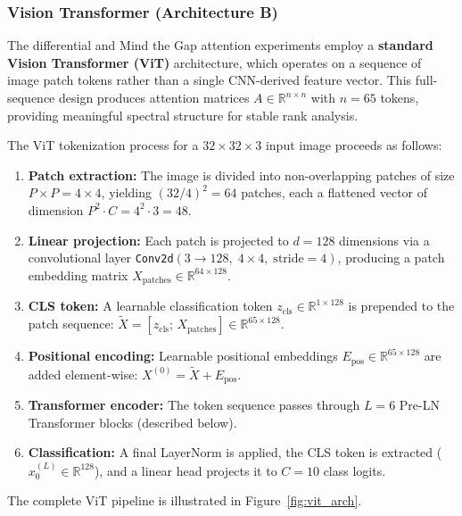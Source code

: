\documentclass[12pt, a4paper]{article}
\begin{document}
\subsubsection{Vision Transformer (Architecture B)}

The differential and Mind the Gap attention experiments employ a
\textbf{standard Vision Transformer (ViT)} architecture, which operates
on a sequence of image patch tokens rather than a single CNN-derived
feature vector. This full-sequence design produces attention matrices
$A \in \mathbb{R}^{n \times n}$ with $n = 65$ tokens, providing
meaningful spectral structure for stable rank analysis.

The ViT tokenization process for a $32 \times 32 \times 3$ input image
proceeds as follows:
\begin{enumerate}[label=(\roman*)]
    \item \textbf{Patch extraction:} The image is divided into
          non-overlapping patches of size $P \times P = 4 \times 4$,
          yielding $(32 / 4)^2 = 64$ patches, each a flattened vector
          of dimension $P^2 \cdot C = 4^2 \cdot 3 = 48$.
    \item \textbf{Linear projection:} Each patch is projected to
          $d = 128$ dimensions via a convolutional layer
          \texttt{Conv2d}$(3 \to 128, \; 4 \times 4, \;
          \text{stride} = 4)$, producing a patch embedding matrix
          $X_{\text{patches}} \in \mathbb{R}^{64 \times 128}$.
    \item \textbf{CLS token:} A learnable classification token
          $z_{\text{cls}} \in \mathbb{R}^{1 \times 128}$ is prepended
          to the patch sequence:
          $\tilde{X} = [z_{\text{cls}};\, X_{\text{patches}}]
          \in \mathbb{R}^{65 \times 128}$.
    \item \textbf{Positional encoding:} Learnable positional embeddings
          $E_{\text{pos}} \in \mathbb{R}^{65 \times 128}$ are added
          element-wise:
          $X^{(0)} = \tilde{X} + E_{\text{pos}}$.
    \item \textbf{Transformer encoder:} The token sequence passes
          through $L = 6$ Pre-LN Transformer blocks (described below).
    \item \textbf{Classification:} A final LayerNorm is applied, the
          CLS token is extracted ($x^{(L)}_0 \in \mathbb{R}^{128}$),
          and a linear head projects it to $C = 10$ class logits.
\end{enumerate}

The complete ViT pipeline is illustrated in
Figure~\ref{fig:vit_arch}.
\end{document}
